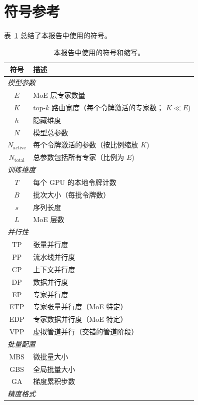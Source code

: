 \documentclass[10pt,logo,copyright]{nvidiatechreport_zh}
\begin{document}



\newpage
\appendix

\section{符号参考}\label{sec:notation}

表~\ref{tab:notation} 总结了本报告中使用的符号。

\begin{table}[ht]
\centering
\caption{本报告中使用的符号和缩写。}
\label{tab:notation}
\begin{tabular}{cl}
\toprule
\textbf{符号} & \textbf{描述} \\
\midrule
\multicolumn{2}{l}{\emph{模型参数}} \\
$E$ & MoE 层专家数量 \\
$K$ & top-$k$ 路由宽度（每个令牌激活的专家数； $K \ll E$) \\
$h$ & 隐藏维度 \\
$N$ & 模型总参数 \\
$N_{\text{active}}$ & 每个令牌激活的参数（按比例缩放 $K$) \\
$N_{\text{total}}$ & 总参数包括所有专家（比例为 $E$) \\
\midrule
\multicolumn{2}{l}{\emph{训练维度}} \\
$T$ & 每个 GPU 的本地令牌计数 \\
$B$ & 批次大小（每批令牌数） \\
$s$ & 序列长度 \\
$L$ & MoE 层数 \\
\midrule
\multicolumn{2}{l}{\emph{并行性}} \\
TP & 张量并行度 \\
PP & 流水线并行度 \\
CP & 上下文并行度 \\
DP & 数据并行度 \\
EP & 专家并行度 \\
ETP & 专家张量并行度（MoE 特定） \\
EDP & 专家数据并行度（MoE 特定） \\
VPP & 虚拟管道并行（交错的管道阶段） \\
\midrule
\multicolumn{2}{l}{\emph{批量配置}} \\
MBS & 微批量大小 \\
GBS & 全局批量大小 \\
GA & 梯度累积步数 \\
\midrule
\multicolumn{2}{l}{\emph{精度格式}} \\

\end{tabular}
\end{table}
\end{document}
